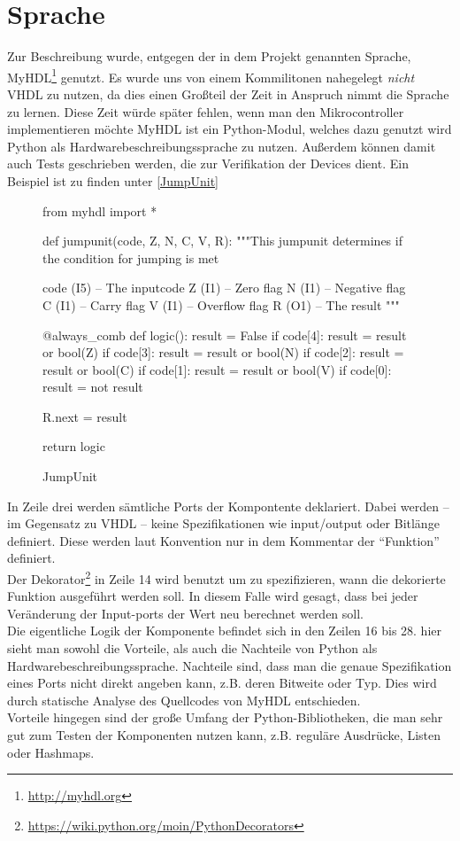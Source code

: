 \section{Sprache}
Zur Beschreibung wurde, entgegen der in dem Projekt genannten Sprache, MyHDL\footnote{\url{http://myhdl.org}} genutzt. Es wurde uns von einem Kommilitonen nahegelegt \textit{nicht} VHDL zu nutzen, da dies einen Großteil der Zeit in Anspruch nimmt die Sprache zu lernen. Diese Zeit würde später fehlen, wenn man den Mikrocontroller implementieren möchte
MyHDL ist ein Python-Modul, welches dazu genutzt wird Python als Hardwarebeschreibungssprache zu nutzen. Außerdem können damit auch Tests geschrieben werden, die zur Verifikation der Devices dient.
Ein Beispiel ist zu finden unter \autoref{JumpUnit}

\begin{center}
\begin{figure}[ht]
\small
\begin{pythoncode}
from myhdl import *

def jumpunit(code, Z, N, C, V, R):
    """This jumpunit determines if the condition for jumping is met

    code (I5) -- The inputcode
    Z    (I1) -- Zero flag
    N    (I1) -- Negative flag
    C    (I1) -- Carry flag
    V    (I1) -- Overflow flag
    R    (O1) -- The result
    """

    @always_comb
    def logic():
        result = False
        if code[4]:
            result = result or bool(Z)
        if code[3]:
            result = result or bool(N)
        if code[2]:
            result = result or bool(C)
        if code[1]:
            result = result or bool(V)
        if code[0]:
            result = not result

        R.next = result

    return logic
\end{pythoncode}
\caption{\label{JumpUnit}JumpUnit}
\end{figure}
\end{center}

In Zeile drei werden sämtliche Ports der Kompontente deklariert. Dabei werden -- im Gegensatz zu VHDL -- keine Spezifikationen wie input/output oder Bitlänge definiert. Diese werden laut Konvention nur in dem Kommentar der ``Funktion'' definiert.\\
Der Dekorator\footnote{\url{https://wiki.python.org/moin/PythonDecorators}} in Zeile 14 wird benutzt um zu spezifizieren, wann die dekorierte Funktion ausgeführt werden soll. In diesem Falle wird gesagt, dass bei jeder Veränderung der Input-ports der Wert neu berechnet werden soll.\\
Die eigentliche Logik der Komponente befindet sich in den Zeilen 16 bis 28. hier sieht man sowohl die Vorteile, als auch die Nachteile von Python als Hardwarebeschreibungssprache. Nachteile sind, dass man die genaue Spezifikation eines Ports nicht direkt angeben kann, z.B. deren Bitweite oder Typ. Dies wird durch statische Analyse des Quellcodes von MyHDL entschieden.\\
Vorteile hingegen sind der große Umfang der Python-Bibliotheken, die man sehr gut zum Testen der Komponenten nutzen kann, z.B. reguläre Ausdrücke, Listen oder Hashmaps.


